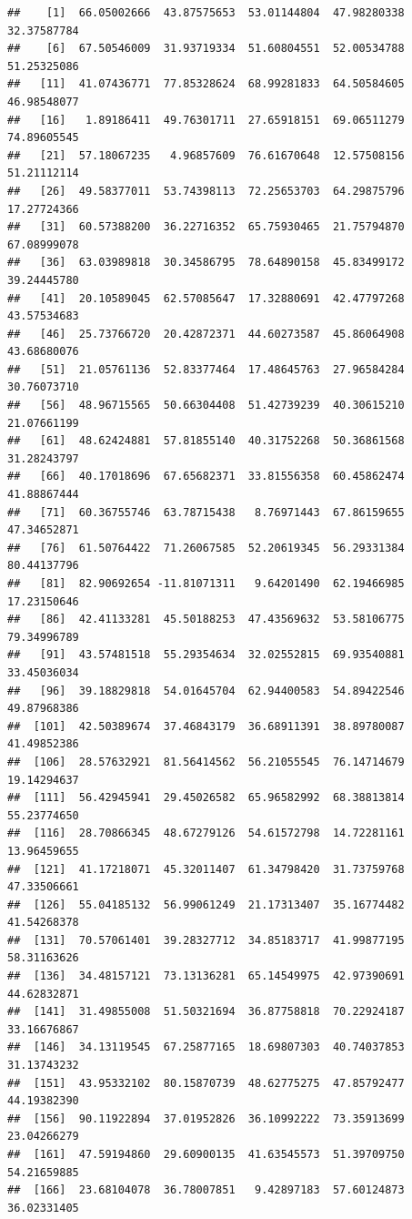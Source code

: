 \documentclass[
]{article}
\begin{document}
\begin{verbatim}
##    [1]  66.05002666  43.87575653  53.01144804  47.98280338  32.37587784
##    [6]  67.50546009  31.93719334  51.60804551  52.00534788  51.25325086
##   [11]  41.07436771  77.85328624  68.99281833  64.50584605  46.98548077
##   [16]   1.89186411  49.76301711  27.65918151  69.06511279  74.89605545
##   [21]  57.18067235   4.96857609  76.61670648  12.57508156  51.21112114
##   [26]  49.58377011  53.74398113  72.25653703  64.29875796  17.27724366
##   [31]  60.57388200  36.22716352  65.75930465  21.75794870  67.08999078
##   [36]  63.03989818  30.34586795  78.64890158  45.83499172  39.24445780
##   [41]  20.10589045  62.57085647  17.32880691  42.47797268  43.57534683
##   [46]  25.73766720  20.42872371  44.60273587  45.86064908  43.68680076
##   [51]  21.05761136  52.83377464  17.48645763  27.96584284  30.76073710
##   [56]  48.96715565  50.66304408  51.42739239  40.30615210  21.07661199
##   [61]  48.62424881  57.81855140  40.31752268  50.36861568  31.28243797
##   [66]  40.17018696  67.65682371  33.81556358  60.45862474  41.88867444
##   [71]  60.36755746  63.78715438   8.76971443  67.86159655  47.34652871
##   [76]  61.50764422  71.26067585  52.20619345  56.29331384  80.44137796
##   [81]  82.90692654 -11.81071311   9.64201490  62.19466985  17.23150646
##   [86]  42.41133281  45.50188253  47.43569632  53.58106775  79.34996789
##   [91]  43.57481518  55.29354634  32.02552815  69.93540881  33.45036034
##   [96]  39.18829818  54.01645704  62.94400583  54.89422546  49.87968386
##  [101]  42.50389674  37.46843179  36.68911391  38.89780087  41.49852386
##  [106]  28.57632921  81.56414562  56.21055545  76.14714679  19.14294637
##  [111]  56.42945941  29.45026582  65.96582992  68.38813814  55.23774650
##  [116]  28.70866345  48.67279126  54.61572798  14.72281161  13.96459655
##  [121]  41.17218071  45.32011407  61.34798420  31.73759768  47.33506661
##  [126]  55.04185132  56.99061249  21.17313407  35.16774482  41.54268378
##  [131]  70.57061401  39.28327712  34.85183717  41.99877195  58.31163626
##  [136]  34.48157121  73.13136281  65.14549975  42.97390691  44.62832871
##  [141]  31.49855008  51.50321694  36.87758818  70.22924187  33.16676867
##  [146]  34.13119545  67.25877165  18.69807303  40.74037853  31.13743232
##  [151]  43.95332102  80.15870739  48.62775275  47.85792477  44.19382390
##  [156]  90.11922894  37.01952826  36.10992222  73.35913699  23.04266279
##  [161]  47.59194860  29.60900135  41.63545573  51.39709750  54.21659885
##  [166]  23.68104078  36.78007851   9.42897183  57.60124873  36.02331405

\end{verbatim}
\end{document}
